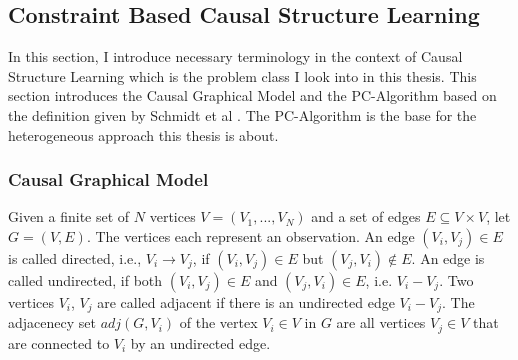 \subsection{Constraint Based Causal Structure Learning}
In this section, I introduce necessary terminology in the context of Causal Structure Learning which is the problem class I look into in this thesis. This section introduces the Causal Graphical Model and the PC-Algorithm based on the definition given by Schmidt et al \cite{constraintgpu}. The PC-Algorithm is the base for the heterogeneous approach this thesis is about.

\subsubsection{Causal Graphical Model}
Given a finite set of $N$ vertices $V = (V_1,...,V_N)$ and a set of edges $E \subseteq V \times V$, let $G = (V,E)$. The vertices each represent an observation. An edge $(V_i, V_j) \in E$ is called directed, i.e., $V_i \rightarrow V_j$, if $(V_i,V_j) \in E$ but $(V_j, V_i) \notin E$. An edge is called undirected, if both $(V_i,V_j) \in E$ and $(V_j, V_i) \in E$, i.e. $V_i - V_j$. Two vertices $V_i$, $V_j$ are called adjacent if there is an undirected edge $V_i - V_j$. The adjacenecy set $adj(G, V_i)$ of the vertex $V_i \in V$ in $G$ are all vertices $V_j \in V$ that are connected to $V_i$ by an undirected edge.

